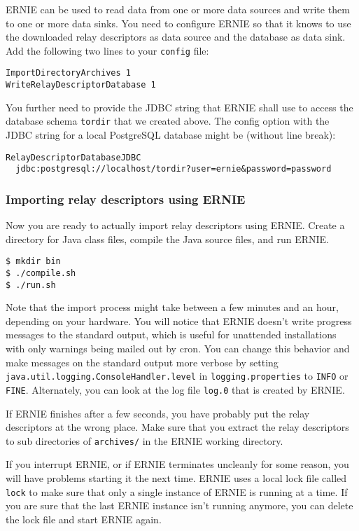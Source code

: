 \documentclass{article}
\begin{document}
ERNIE can be used to read data from one or more data sources and write
them to one or more data sinks.
You need to configure ERNIE so that it knows to use the downloaded relay
descriptors as data source and the database as data sink.
Add the following two lines to your \verb+config+ file:

\begin{verbatim}
ImportDirectoryArchives 1
WriteRelayDescriptorDatabase 1
\end{verbatim}

You further need to provide the JDBC string that ERNIE shall use to access
the database schema \verb+tordir+ that we created above.
The config option with the JDBC string for a local PostgreSQL database
might be (without line break):

\begin{verbatim}
RelayDescriptorDatabaseJDBC
  jdbc:postgresql://localhost/tordir?user=ernie&password=password
\end{verbatim}

\subsubsection{Importing relay descriptors using ERNIE}

Now you are ready to actually import relay descriptors using ERNIE.
Create a directory for Java class files, compile the Java source files,
and run ERNIE.

\begin{verbatim}
$ mkdir bin
$ ./compile.sh
$ ./run.sh
\end{verbatim}

Note that the import process might take between a few minutes and an hour,
depending on your hardware.
You will notice that ERNIE doesn't write progress messages to the standard
output, which is useful for unattended installations with only warnings
being mailed out by cron.
You can change this behavior and make messages on the standard output more
verbose by setting
\verb+java.util.logging.ConsoleHandler.level+ in
\verb+logging.properties+ to \verb+INFO+ or \verb+FINE+.
Alternately, you can look at the log file \verb+log.0+ that is created by
ERNIE.

If ERNIE finishes after a few seconds, you have probably put the relay
descriptors at the wrong place.
Make sure that you extract the relay descriptors to sub directories of
\verb+archives/+ in the ERNIE working directory.

If you interrupt ERNIE, or if ERNIE terminates uncleanly for some reason,
you will have problems starting it the next time.
ERNIE uses a local lock file called \verb+lock+ to make sure that only a
single instance of ERNIE is running at a time.
If you are sure that the last ERNIE instance isn't running anymore, you
can delete the lock file and start ERNIE again.
\end{document}
